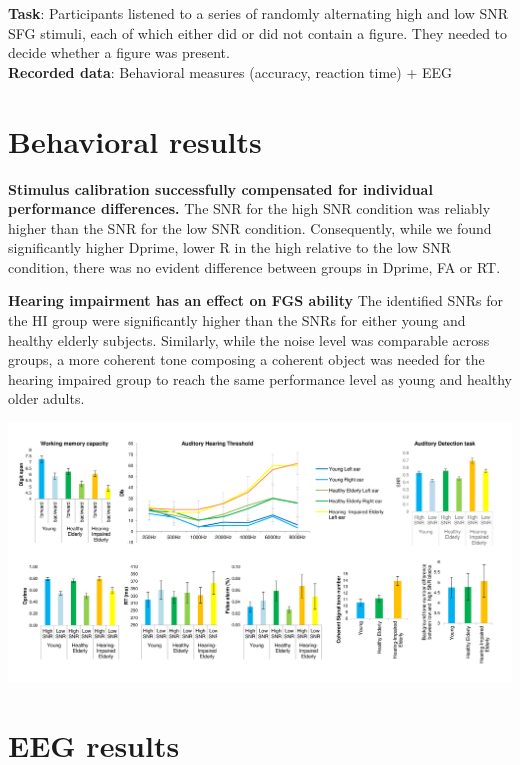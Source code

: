\documentclass[a0,portrait]{a0poster}
\begin{document}
\begin{multicols}{2}
\textbf{Task}: Participants listened to a series of randomly alternating high and low SNR SFG stimuli, each of which either did or did not contain a figure. They needed to decide whether a figure was present. \\
\textbf{Recorded data}: Behavioral measures (accuracy, reaction time) + EEG
\section*{Behavioral results}

	 \textbf{Stimulus calibration successfully compensated for individual performance differences.} The SNR for the high SNR condition was reliably higher than the SNR for the low SNR condition. Consequently, while we found significantly higher Dprime,  lower  R in the high relative to the low SNR condition, there was no evident difference between groups in Dprime, FA or RT. 
	
	 \textbf{Hearing impairment has an effect on FGS ability} The identified SNRs for the HI group were significantly higher than the SNRs for either young and healthy elderly subjects. Similarly, while the noise level was comparable across groups, a more coherent tone composing a coherent object was needed for the hearing impaired group to reach the same performance level as young and healthy older adults.	
	 
	 \begin{center}\vspace{0cm}
	 	\includegraphics[width=0.95\linewidth]{Fig_behav.png}
	 \end{center}\vspace{0cm}
 
 
 \section*{EEG results}
	

\end{multicols}
\end{document}

